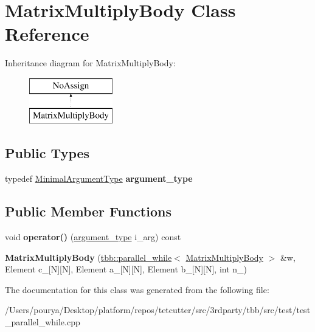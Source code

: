\hypertarget{classMatrixMultiplyBody}{}\section{Matrix\+Multiply\+Body Class Reference}
\label{classMatrixMultiplyBody}
Inheritance diagram for Matrix\+Multiply\+Body\+:\begin{figure}[H]
\begin{center}
\leavevmode
\includegraphics[height=2.000000cm]{classMatrixMultiplyBody}
\end{center}
\end{figure}
\subsection*{Public Types}
\begin{DoxyCompactItemize}
\item 
\hypertarget{classMatrixMultiplyBody_aa4ede980375027261c309c695648e08d}{}typedef \hyperlink{classMinimalArgumentType}{Minimal\+Argument\+Type} {\bfseries argument\+\_\+type}\label{classMatrixMultiplyBody_aa4ede980375027261c309c695648e08d}

\end{DoxyCompactItemize}
\subsection*{Public Member Functions}
\begin{DoxyCompactItemize}
\item 
\hypertarget{classMatrixMultiplyBody_aa15d23010f35dd7a198db161f678ecb6}{}void {\bfseries operator()} (\hyperlink{classMinimalArgumentType}{argument\+\_\+type} i\+\_\+arg) const \label{classMatrixMultiplyBody_aa15d23010f35dd7a198db161f678ecb6}

\item 
\hypertarget{classMatrixMultiplyBody_a7433afc9e0c65ab1e7535f638adaffdc}{}{\bfseries Matrix\+Multiply\+Body} (\hyperlink{classtbb_1_1parallel__while}{tbb\+::parallel\+\_\+while}$<$ \hyperlink{classMatrixMultiplyBody}{Matrix\+Multiply\+Body} $>$ \&w, Element c\+\_\+\mbox{[}N\mbox{]}\mbox{[}N\mbox{]}, Element a\+\_\+\mbox{[}N\mbox{]}\mbox{[}N\mbox{]}, Element b\+\_\+\mbox{[}N\mbox{]}\mbox{[}N\mbox{]}, int n\+\_\+)\label{classMatrixMultiplyBody_a7433afc9e0c65ab1e7535f638adaffdc}

\end{DoxyCompactItemize}


The documentation for this class was generated from the following file\+:\begin{DoxyCompactItemize}
\item 
/\+Users/pourya/\+Desktop/platform/repos/tetcutter/src/3rdparty/tbb/src/test/test\+\_\+parallel\+\_\+while.\+cpp\end{DoxyCompactItemize}
